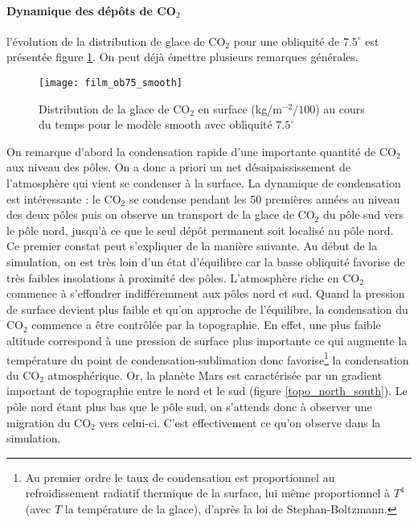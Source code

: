 \documentclass[11pt,a4paper]{article}
\begin{document}
\paragraph{Dynamique des dépôts de CO$_2$ \\}
l'évolution de la distribution de glace de CO$_2$ pour une obliquité de $7.5^\circ$ est présentée figure \ref{film_ob7.5_smooth}. On peut déjà émettre plusieurs remarques générales.

\begin{figure}[h!]
\begin{center}
\texttt{[image: film\_ob75\_smooth]}
\caption{Distribution de la glace de CO$_2$ en surface (kg/m$^{-2}/100$) au cours du temps pour le modèle smooth avec obliquité $7.5^\circ$}
\label{film_ob7.5_smooth}
\end{center}
\end{figure}

On remarque d'abord la condensation rapide d'une importante quantité de CO$_2$ aux niveau des pôles. On a donc a priori un net désaipaississement de l'atmosphère qui vient se condenser à la surface. La dynamique de condensation est intéressante : le CO$_2$ se condense pendant les 50 premières années au niveau des deux pôles puis on observe un transport de la glace de CO$_2$ du pôle sud vers le pôle nord, jusqu'à ce que le seul dépôt permanent soit localisé au pôle nord. \\
Ce premier constat peut s'expliquer de la manière suivante. Au début de la simulation, on est très loin d'un état d'équilibre car la basse obliquité favorise de très faibles insolations à proximité des pôles. L'atmosphère riche en CO$_2$ commence à s'effondrer indifféremment aux pôles nord et sud. Quand la pression de surface devient plus faible et qu'on approche de l'équilibre, la condensation du CO$_2$ commence a être contrôlée par la topographie.  En effet, une plus faible altitude correspond à une pression de surface plus importante ce qui augmente la température du point de condensation-sublimation donc favorise\footnote{Au premier ordre le taux de condensation est proportionnel au refroidissement radiatif thermique de la surface, lui même proportionnel à $T^4$ (avec $T$ la température de la glace), d'après la loi de Stephan-Boltzmann.} la condensation du CO$_2$ atmosphérique. Or, la planète Mars est caractérisée par un gradient important de topographie entre le nord et le sud (figure \ref{topo_north_south}). Le pôle nord étant plus bas que le pôle sud, on s'attends donc à observer une migration du CO$_2$ vers celui-ci. C'est effectivement ce qu'on observe dans la simulation. \\
\end{document}
